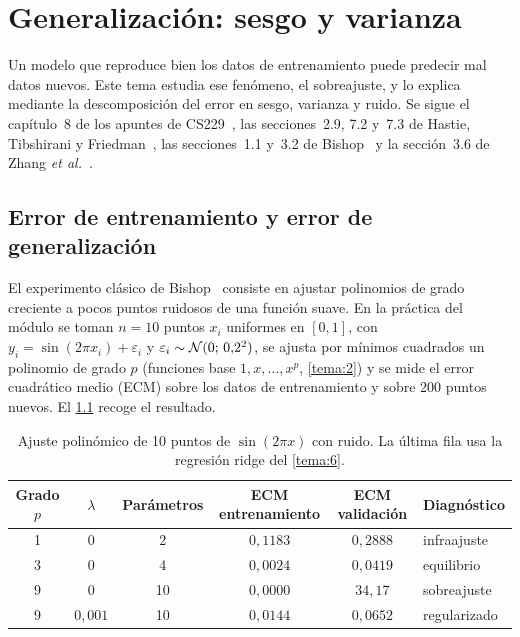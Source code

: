 \chapter{Generalización: sesgo y varianza}
\label{tema:5}

Un modelo que reproduce bien los datos de entrenamiento puede predecir mal datos nuevos. Este tema estudia ese fenómeno, el sobreajuste, y lo explica mediante la descomposición del error en sesgo, varianza y ruido. Se sigue el capítulo~8 de los apuntes de CS229~\cite[§8.1--8.2]{cs229}, las secciones~2.9, 7.2 y~7.3 de Hastie, Tibshirani y Friedman~\cite{esl}, las secciones~1.1 y~3.2 de Bishop~\cite{bishop} y la sección~3.6 de Zhang \emph{et al.}~\cite{d2l}.

\section{Error de entrenamiento y error de generalización}

El experimento clásico de Bishop~\cite[§1.1]{bishop} consiste en ajustar polinomios de grado creciente a pocos puntos ruidosos de una función suave. En la práctica del módulo se toman $n=10$ puntos $x_i$ uniformes en $[0,1]$, con $y_i=\sin(2\pi x_i)+\varepsilon_i$ y $\varepsilon_i\sim\mathcal{N}(0;\,0{,}2^{2})$, se ajusta por mínimos cuadrados un polinomio de grado $p$ (funciones base $1,x,\dots,x^{p}$, \cref{tema:2}) y se mide el error cuadrático medio (ECM) sobre los datos de entrenamiento y sobre 200 puntos nuevos. El \cref{tab:polinomios} recoge el resultado.

\begin{table}[h]
\centering\small
\caption{Ajuste polinómico de 10 puntos de $\sin(2\pi x)$ con ruido. La última fila usa la regresión ridge del \cref{tema:6}.}\label{tab:polinomios}
\begin{tabular}{@{}cccccl@{}}
\toprule
Grado $p$ & $\lambda$ & Parámetros & ECM entrenamiento & ECM validación & Diagnóstico \\
\midrule
1 & 0 & 2 & $0{,}1183$ & $0{,}2888$ & infraajuste \\
3 & 0 & 4 & $0{,}0024$ & $0{,}0419$ & equilibrio \\
9 & 0 & 10 & $0{,}0000$ & $34{,}17$ & sobreajuste \\
9 & $0{,}001$ & 10 & $0{,}0144$ & $0{,}0652$ & regularizado \\
\bottomrule
\end{tabular}
\end{table}

